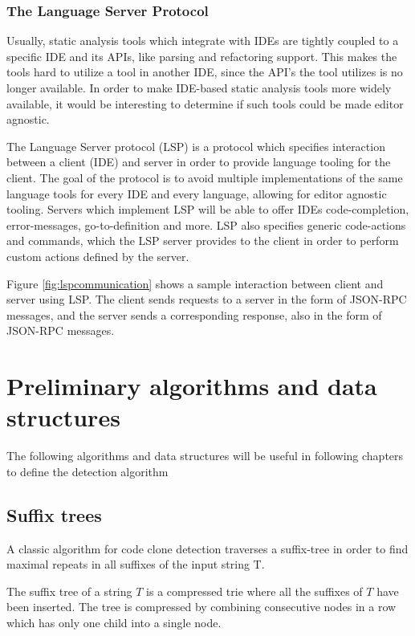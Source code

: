 \subsubsection{The Language Server Protocol}

Usually, static analysis tools which integrate with IDEs are tightly coupled to a specific
IDE and its APIs, like parsing and refactoring support. This makes the tools hard to
utilize a tool in another IDE, since the API's the tool utilizes is no longer available.
In order to make IDE-based static analysis tools more widely available, it would be
interesting to determine if such tools could be made editor agnostic.

The Language Server protocol (LSP) is a protocol which specifies interaction between a
client (IDE) and server in order to provide language tooling for the client. The goal of
the protocol is to avoid multiple implementations of the same language tools for every IDE
and every language, allowing for editor agnostic tooling. Servers which implement LSP will
be able to offer IDEs code-completion, error-messages, go-to-definition and more. LSP also
specifies generic code-actions and commands, which the LSP server provides to the client
in order to perform custom actions defined by the server.

Figure \ref{fig:lspcommunication} shows a sample interaction between client and server
using LSP. The client sends requests to a server in the form of JSON-RPC messages, and the
server sends a corresponding response, also in the form of JSON-RPC messages.

\section{Preliminary algorithms and data structures}

The following algorithms and data structures will be useful in following chapters to
define the detection algorithm

\subsection{Suffix trees}

A classic algorithm for code clone detection traverses a suffix-tree in order to find
maximal repeats in all suffixes of the input string T.

The suffix tree of a string $T$ is a compressed trie where all the suffixes of $T$ have been
inserted. The tree is compressed by combining consecutive nodes in a row which has
only one child into a single node. 

